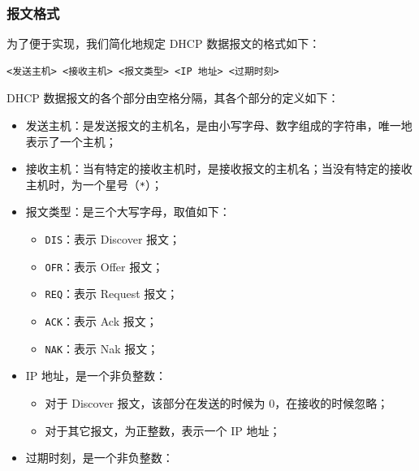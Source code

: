 \subsubsection*{报文格式}

为了便于实现，我们简化地规定 DHCP 数据报文的格式如下：

\begin{lstlisting}
<发送主机> <接收主机> <报文类型> <IP 地址> <过期时刻>
\end{lstlisting}

DHCP 数据报文的各个部分由空格分隔，其各个部分的定义如下：

\begin{itemize}

\item 发送主机：是发送报文的主机名，{}是由小写字母、数字组成的字符串，唯一地表示了一个主机；

\item 接收主机：当有特定的接收主机时，是接收报文的主机名；当没有特定的接收主机时，为一个星号（\verb|*|）；

\item 报文类型：是三个大写字母，取值如下：\begin{itemize}

\item \verb|DIS|：表示 Discover 报文；

\item \verb|OFR|：表示 Offer 报文；

\item \verb|REQ|：表示 Request 报文；

\item \verb|ACK|：表示 Ack 报文；

\item \verb|NAK|：表示 Nak 报文；

\end{itemize}



\item IP 地址，是一个非负整数：\begin{itemize}

\item 对于 Discover 报文，该部分在发送的时候为 0，在接收的时候忽略；

\item 对于其它报文，为正整数，表示一个 IP 地址；

\end{itemize}



\item 过期时刻，是一个非负整数：\begin{itemize}


\end{itemize}
\end{itemize}
